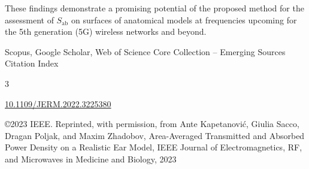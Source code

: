 \begin{description}[leftmargin=!,labelwidth=\widthof{\bfseries Volume and number}]
    These findings demonstrate a promising potential of the proposed method for the assessment of $S_\text{ab}$ on surfaces of anatomical models at frequencies upcoming for the 5th generation (5G) wireless networks and beyond.
    \item[Databases] Scopus, Google Scholar, Web of Science Core Collection -- Emerging Sources Citation Index
    \item[Impact factor] 3
    \item[DOI] \href{https://doi.org/10.1109/JERM.2022.3225380}{\url{10.1109/JERM.2022.3225380}}
    \item[Copyright notice] \copyright 2023 IEEE. Reprinted, with permission, from Ante Kapetanović, Giulia Sacco, Dragan Poljak, and Maxim Zhadobov, Area-Averaged Transmitted and Absorbed Power Density on a Realistic Ear Model, IEEE Journal of Electromagnetics, RF, and Microwaves in Medicine and Biology, 2023
\end{description}

\cleardoublepage


